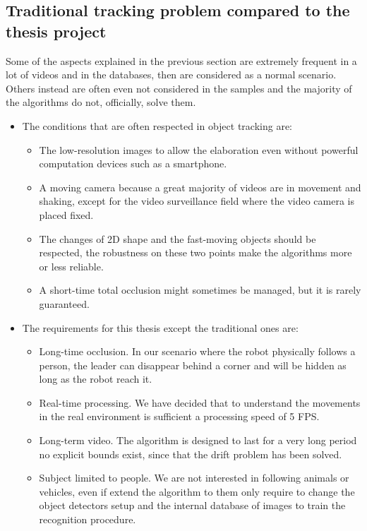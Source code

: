 \subsection{Traditional tracking problem compared to the thesis project} \label{sec:trackingBaseliveVsThesis}
Some of the aspects explained in the previous section are extremely frequent in a lot of videos and in the databases, then are considered as a normal scenario. Others instead are often even not considered in the samples and the majority of the algorithms do not, officially, solve them.
\begin{itemize}
	\item The conditions that are often respected in object tracking are:
	\begin{itemize}
		\item The low-resolution images to allow the elaboration even without powerful computation devices such as a smartphone. 
		\item A moving camera because a great majority of videos are in movement and shaking, except for the video surveillance field where the video camera is placed fixed.
		\item The changes of 2D shape and the fast-moving objects should be respected, the robustness on these two points make the algorithms more or less reliable. 
		\item A short-time total occlusion might sometimes be managed, but it is rarely guaranteed.
	\end{itemize}

	\item The requirements for this thesis except the traditional ones are:
	\begin{itemize}
		\item Long-time occlusion. In our scenario where the robot physically follows a person, the leader can disappear behind a corner and will be hidden as long as the robot reach it.
		\item Real-time processing. We have decided that to understand the movements in the real environment is sufficient a processing speed of 5 FPS.
		\item Long-term video. The algorithm is designed to last for a very long period no explicit bounds exist, since that the drift problem has been solved.
		\item Subject limited to people. We are not interested in following animals or vehicles, even if extend the algorithm to them only require to change the object detectors setup and the internal database of images to train the recognition procedure.
	\end{itemize}
	
\end{itemize}



